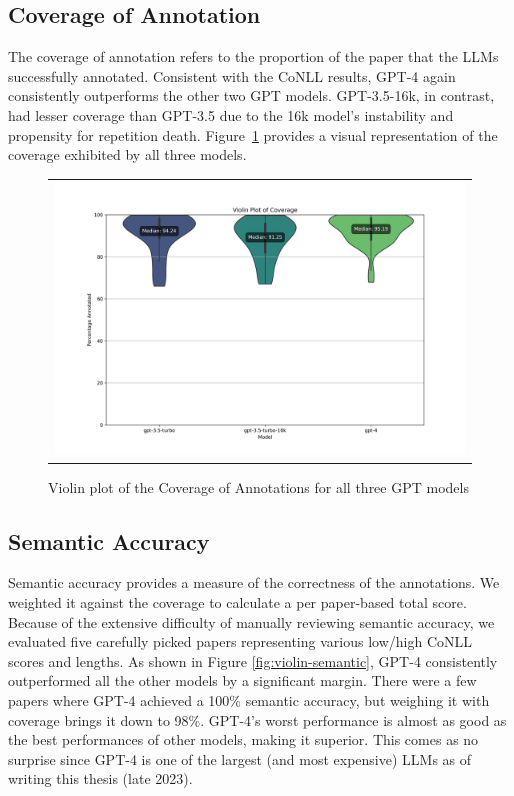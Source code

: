 \subsection{Coverage of Annotation}

The coverage of annotation refers to the proportion of the paper that the LLMs successfully annotated. Consistent with the CoNLL results, GPT-4 again consistently outperforms the other two GPT models. GPT-3.5-16k, in contrast, had lesser coverage than GPT-3.5 due to the 16k model's instability and propensity for repetition death. %
Figure~\ref{fig:violin-coverage} provides a visual representation of the coverage exhibited by all three models.

\begin{figure}[htpb]
  \centering
  \begin{tabular}{c}
  \includegraphics[width=14cm]{images/coverage.png}
  \end{tabular}
  \caption[Distribution of Coverage]{Violin plot of the Coverage of Annotations for all three GPT models}\label{fig:violin-coverage}
\end{figure}
 
\subsection{Semantic Accuracy}
Semantic accuracy provides a measure of the correctness of the annotations. We weighted it against the coverage to calculate a per paper-based total score. Because of the extensive difficulty of manually reviewing semantic accuracy, we evaluated five carefully picked papers representing various low/high CoNLL scores and lengths. As shown in Figure \ref{fig:violin-semantic}, GPT-4 consistently outperformed all the other models by a significant margin. There were a few papers where GPT-4 achieved a 100\% semantic accuracy, but weighing it with coverage brings it down to 98\%. GPT-4's worst performance is almost as good as the best performances of other models, making it superior. This comes as no surprise since GPT-4 is one of the largest (and most expensive) LLMs as of writing this thesis (late 2023).

